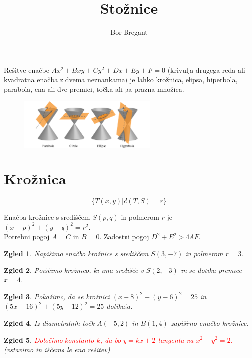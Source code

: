 \documentclass{article}
\title{Stožnice}
\author{Bor Bregant}
\date{\vspace{-5ex}}
\newtheorem*{zgled}{Zgled}
\begin{document}
\maketitle

Rešitve enačbe $Ax^2+Bxy+Cy^2+Dx+Ey+F=0$ (krivulja drugega reda ali kvadratna enačba z dvema neznankama) je lahko krožnica, elipsa, hiperbola, parabola, ena ali dve premici, točka ali pa prazna množica.

\begin{figure}[H]
\includegraphics[width=0.6\textwidth]{stoznice.png}
\centering
\end{figure}

\section{Krožnica}

\[\{T(x,y) | d(T,S)=r\}\]

Enačba krožnice s središčem $S(p,q)$ in polmerom $r$ je $(x-p)^2+(y-q)^2=r^2$.\\

Potrebni pogoj $A=C$ in $B=0$. Zadostni pogoj $D^2+E^2>4AF$.

\begin{zgled}
    Napišimo enačbo krožnice s središčem $S(3,-7)$ in polmerom $r=3$.
\end{zgled}

\begin{zgled}
    Poiščimo krožnico, ki ima središče v $S(2,-3)$ in se dotika premice $x=4$. 
\end{zgled}

\begin{zgled}
    Pokažimo, da se krožnici $(x-8)^2+(y-6)^2=25$ in $(5x-16)^2+(5y-12)^2=25$ dotikata.
\end{zgled}

\begin{zgled}
    Iz diametralnih točk $A(-5,2)$ in $B(1,4)$ zapišimo enačbo krožnice.
\end{zgled}

\begin{zgled}
    \textcolor{red}{Določimo konstanto $k$, da bo $y=kx+2$ tangenta na $x^2+y^2=2$.} (vstavimo in iščemo le eno rešitev)
\end{zgled}
\end{document}
